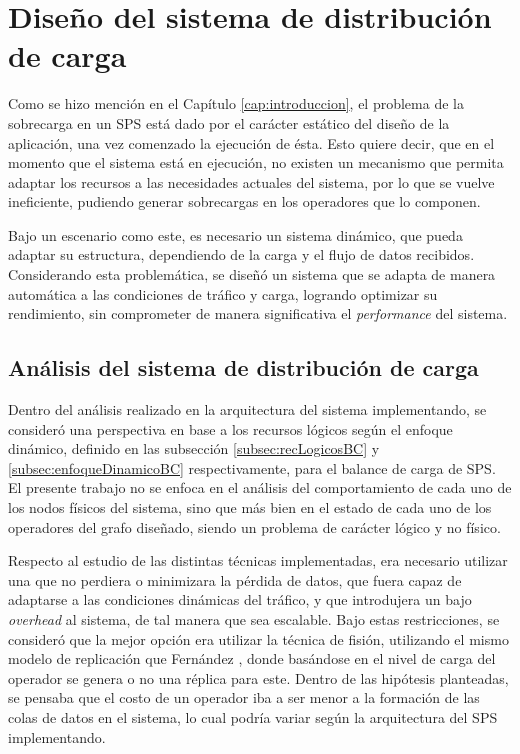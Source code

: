 \chapter{Dise\~no del sistema de distribución de carga}
\label{cap:disenoSistema}

Como se hizo mención en el Capítulo \ref{cap:introduccion}, el problema de la sobrecarga en un SPS está dado por el carácter estático del diseño de la aplicación, una vez comenzado la ejecución de ésta. Esto quiere decir, que en el momento que el sistema está en ejecución, no existen un mecanismo que permita adaptar los recursos a las necesidades actuales del sistema, por lo que se vuelve ineficiente, pudiendo generar sobrecargas en los operadores que lo componen.

Bajo un escenario como este, es necesario un sistema dinámico, que pueda adaptar su estructura, dependiendo de la carga y el flujo de datos recibidos. Considerando esta problemática, se diseñó un sistema que se adapta de manera automática a las condiciones de tráfico y carga, logrando optimizar su rendimiento, sin comprometer de manera significativa el \textit{performance} del sistema.

\section{Análisis del sistema de distribución de carga}
Dentro del análisis realizado en la arquitectura del sistema implementando, se consideró una perspectiva en base a los recursos lógicos según el enfoque dinámico, definido en las subsección \ref{subsec:recLogicosBC} y \ref{subsec:enfoqueDinamicoBC} respectivamente, para el balance de carga de SPS. El presente trabajo no se enfoca en el análisis del comportamiento de cada uno de los nodos físicos del sistema, sino que más bien en el estado de cada uno de los operadores del grafo diseñado, siendo un problema de carácter lógico y no físico.

Respecto al estudio de las distintas técnicas implementadas, era necesario utilizar una que no perdiera o minimizara la pérdida de datos, que fuera capaz de adaptarse a las condiciones dinámicas del tráfico, y que introdujera un bajo \textit{overhead} al sistema, de tal manera que sea escalable. Bajo estas restricciones, se consideró que la mejor opción era utilizar la técnica de fisión, utilizando el mismo modelo de replicación que Fernández \citep{FernandezMKP13}, donde basándose en el nivel de carga del operador se genera o no una réplica para este. Dentro de las hipótesis planteadas, se pensaba que el costo de un operador iba a ser menor a la formación de las colas de datos en el sistema, lo cual podría variar según la arquitectura del SPS implementando.

